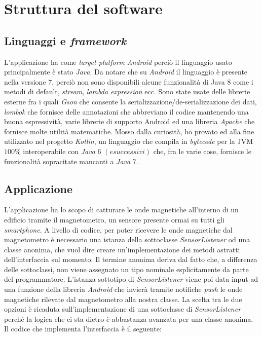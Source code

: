 \chapter{Struttura del software}

\section{Linguaggi e \textit{framework}}
L'applicazione ha come \textit{target platform} \textit{Android} perci\`o il linguaggio usato principalmente \`e stato \textit{Java}. Da notare che su \textit{Android} il linguaggio \`e presente nella versione 7, perci\`o non sono disponibili alcune funzionalit\`a di Java 8 come i metodi di default, \textit{stream}, \textit{lambda expression} ecc. Sono state usate delle librerie esterne fra i quali \textit{Gson} che consente la serializzazione/de-serializzazione dei dati, \textit{lombok} che fornisce delle annotazioni che abbreviano il codice mantenendo una buona espressivit\`a, varie librerie di supporto Android ed una libreria \textit{Apache} che fornisce molte utilit\`a matematiche. Mosso dalla curiosit\`a, ho provato ed alla fine utilizzato nel progetto \textit{Kotlin}, un linguaggio che compila in \textit{bytecode} per la JVM $100 \%$ interoperabile con \textit{Java} 6 $(e successivi)$ che, fra le varie cose, fornisce le funzionalit\`a sopracitate mancanti a \textit{Java} 7.

\section{Applicazione}
L'applicazione ha lo scopo di catturare le onde magnetiche all'interno di un edificio tramite il magnetometro, un sensore presente ormai su tutti gli \textit{smartphone}. A livello di codice, per poter ricevere le onde magnetiche dal magnetometro \`e necessario una istanza della sottoclasse \textit{SensorListener} od una classe anonima, che vuol dire creare un'implementazione dei metodi astratti dell'interfaccia sul momento. Il termine anonima deriva dal fatto che, a differenza delle sottoclassi, non viene assegnato un tipo nominale esplicitamente da parte del programmatore. L'istanza sottotipo di \textit{SensorListener} viene poi data input ad una funzione della libreria \textit{Android} che invier\`a  tramite notifiche \textit{push} le onde magnetiche rilevate dal magnetometro alla nostra classe. La scelta tra le due opzioni \`e ricaduta sull'implementazione di una sottoclasse di \textit{SensorListener} perch\'e la logica che ci sta dietro \`e abbastanza avanzata per una classe anonima. Il codice che implementa l'interfaccia  \`e il seguente:


